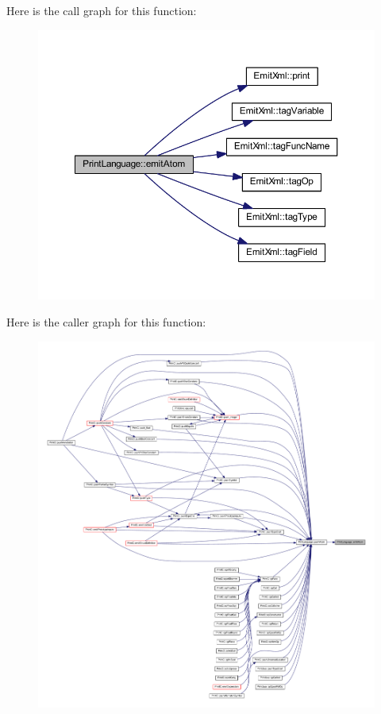 Here is the call graph for this function\+:
\nopagebreak
\begin{figure}[H]
\begin{center}
\leavevmode
\includegraphics[width=350pt]{class_print_language_ad5077f844d4095c52594fc946893db87_cgraph}
\end{center}
\end{figure}
Here is the caller graph for this function\+:
\nopagebreak
\begin{figure}[H]
\begin{center}
\leavevmode
\includegraphics[width=350pt]{class_print_language_ad5077f844d4095c52594fc946893db87_icgraph}
\end{center}
\end{figure}
\mbox{\label{class_print_language_a70818723a04d7855897a309284349b03}} 
